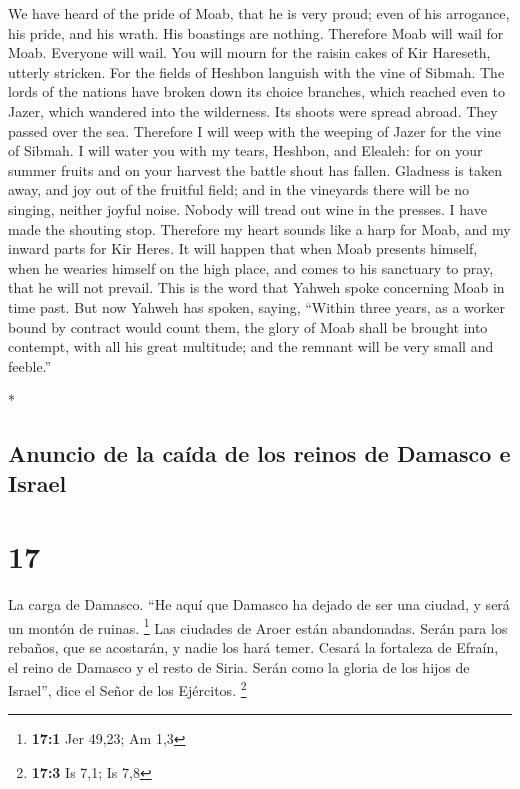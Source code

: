 \begin{paracol}{2}
\begin{otherlanguage}{english}
 We have heard of the pride of Moab, that he is very
proud; even of his arrogance, his pride, and his wrath. His boastings
are nothing.  Therefore Moab will wail for Moab. Everyone
will wail. You will mourn for the raisin cakes of Kir Hareseth, utterly
stricken.  For the fields of Heshbon languish with the
vine of Sibmah. The lords of the nations have broken down its choice
branches, which reached even to Jazer, which wandered into the
wilderness. Its shoots were spread abroad. They passed over the sea.
 Therefore I will weep with the weeping of Jazer for the
vine of Sibmah. I will water you with my tears, Heshbon, and Elealeh:
for on your summer fruits and on your harvest the battle shout has
fallen.  Gladness is taken away, and joy out of the
fruitful field; and in the vineyards there will be no singing, neither
joyful noise. Nobody will tread out wine in the presses. I have made the
shouting stop.  Therefore my heart sounds like a harp for
Moab, and my inward parts for Kir Heres.  It will happen
that when Moab presents himself, when he wearies himself on the high
place, and comes to his sanctuary to pray, that he will not prevail.
 This is the word that Yahweh spoke concerning Moab in
time past.  But now Yahweh has spoken, saying, ``Within
three years, as a worker bound by contract would count them, the glory
of Moab shall be brought into contempt, with all his great multitude;
and the remnant will be very small and feeble.''

\end{otherlanguage}

\switchcolumn[0]*

\hypertarget{anuncio-de-la-cauxedda-de-los-reinos-de-damasco-e-israel}{%
\subsection{Anuncio de la caída de los reinos de Damasco e
Israel}\label{anuncio-de-la-cauxedda-de-los-reinos-de-damasco-e-israel}}

\hypertarget{section-32}{%
\section{17}\label{section-32}}

 La carga de Damasco. ``He aquí que Damasco ha dejado de
ser una ciudad, y será un montón de ruinas. \footnote{\textbf{17:1} Jer
  49,23; Am 1,3}  Las ciudades de Aroer están abandonadas.
Serán para los rebaños, que se acostarán, y nadie los hará temer.
 Cesará la fortaleza de Efraín, el reino de Damasco y el
resto de Siria. Serán como la gloria de los hijos de Israel'', dice el
Señor de los Ejércitos. \footnote{\textbf{17:3} Is 7,1; Is 7,8}


\end{paracol}
